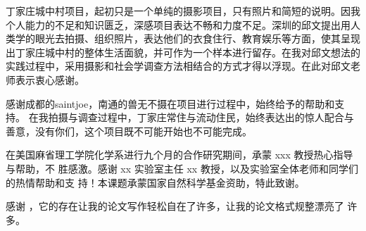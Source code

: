 \begin{acknowledgement}
  丁家庄城中村项目，起初只是一个单纯的摄影项目，只有照片和简短的说明。因我个人能力的不足和知识匮乏，深感项目表达不畅和力度不足。深圳的邱文提出用人类学的眼光去拍摄、组织照片，表达他们的衣食住行、教育娱乐等方面，使其呈现出丁家庄城中村的整体生活面貌，并可作为一个样本进行留存。在我对邱文想法的实践过程中，采用摄影和社会学调查方法相结合的方式才得以浮现。在此对邱文老师表示衷心感谢。

  感谢成都的saintjoe，南通的兽无不摄在项目进行过程中，始终给予的帮助和支持。
  在我拍摄与调查过程中，丁家庄常住与流动住民，始终表达出的惊人配合与善意，没有你们，这个项目既不可能开始也不可能完成。
  
  在美国麻省理工学院化学系进行九个月的合作研究期间，承蒙 xxx 教授热心指导与帮助，不
  胜感激。感谢 xx 实验室主任 xx 教授，以及实验室全体老师和同学们的热情帮助和支
  持！本课题承蒙国家自然科学基金资助，特此致谢。

  感谢 \thuthesis，它的存在让我的论文写作轻松自在了许多，让我的论文格式规整漂亮了
  许多。
\end{acknowledgement}
